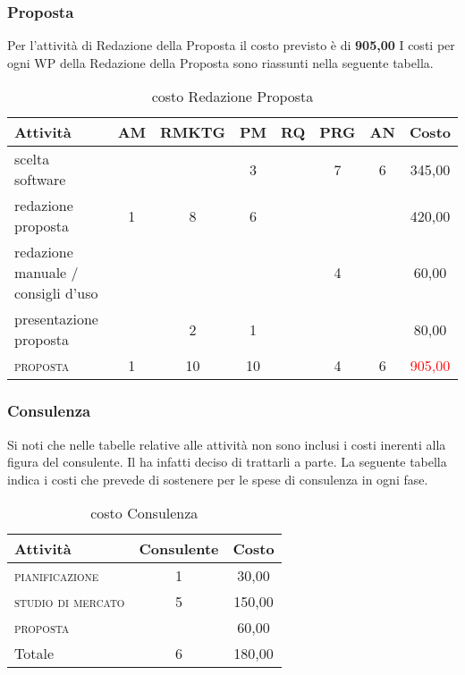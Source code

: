 \subsubsection{Proposta}
Per l'attività di Redazione della Proposta il costo previsto è di \textbf	{ \text{\euro} 905,00 }	
I costi per ogni WP della Redazione della Proposta sono riassunti nella seguente tabella.

\begin{table}[!h]
\footnotesize
\centering
\begin{tabular}{|p{}|c|c|c|c|c|c|c|}
\hline
\textbf{Attività}& \textbf{AM} & \textbf{RMKTG} & \textbf{PM} & \textbf{RQ} & \textbf{PRG} & \textbf{AN} & \textbf{Costo}  \\ 
\hline
scelta software			& & & 3&	& 7&	6& 	\text{\euro} 345,00 \\
redazione proposta & 1&	8&	6& & & & 	 \text{\euro} 420,00 \\
redazione manuale / consigli d'uso & & & & & 					4 && 	\text{\euro} 60,00 \\	
presentazione proposta		 & & 2&  	1	& & 	& & 		 \text{\euro} 80,00 \\	
\hline
\scshape{}proposta  							& 1  &10 &10& &	4&	6&	\textcolor{red}{ \text{\euro} 905,00 }\\		 
\hline
\end{tabular}
\caption{costo Redazione Proposta}\label{tab:proposta}
\end{table}	
	
	
\subsubsection*{Consulenza}

Si noti che nelle tabelle relative alle attività non sono inclusi i costi inerenti alla figura del consulente. Il  ha infatti deciso di trattarli a parte. La seguente tabella indica i costi che \team prevede di sostenere per le spese di consulenza in ogni fase.
	
\begin{table}[!h]
\centering
\begin{tabular}{|l|c|c|}
\hline
\textbf{Attività}& \textbf{Consulente} & \textbf{Costo}  \\           
\hline
\scshape{}pianificazione		& 1& \text{\euro} 30,00 \\
\scshape{}studio di mercato 	& 5& \text{\euro} 150,00 \\
\scshape{}proposta 			& &	\text{\euro} 60,00 \\	
\hline
Totale				& 6& \text{\euro} 180,00 \\	
\hline
\end{tabular}
\caption{costo Consulenza}\label{tab:consulenza}
\end{table}

